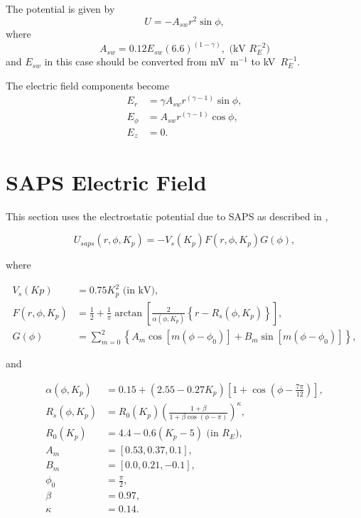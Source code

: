 \documentclass[]{article}
\begin{document}
The potential is given by 
\begin{equation}
	U = -A_{sw} r^2 \sin{\phi},
\end{equation}
where 
\begin{equation}
	A_{sw} = 0.12 E_{sw} (6.6)^{(1-\gamma)}, \text{ (kV $R_E^{-2}$)}
\end{equation}
and $E_{sw}$ in this case should be converted from mV~m$^{-1}$ to kV~$R_E^{-1}$.

The electric field components become
\begin{align}
E_r &= \gamma A_{sw} r^{(\gamma-1)}\sin{\phi},\\
E_\phi &= A_{sw} r^{(\gamma-1)} \cos{\phi},\\
E_z &= 0.
\end{align}


\section{SAPS Electric Field}

	This section uses the electrostatic potential due to SAPS as described in \citet{Goldstein2005},
	
	\begin{equation}
		U_{saps}(r,\phi,K_p) = -V_s(K_p) F(r,\phi,K_p) G(\phi),
	\end{equation}

	where
	
	\begin{align}
		V_s(Kp) &= 0.75 K_p^2 \text{ (in kV)}, \\
		F(r,\phi,K_p) &= \frac{1}{2} + \frac{1}{\pi}\arctan{\left[\frac{2}{\alpha(\phi,K_p)}\left\{ r - R_s(\phi,K_p)\right\}\right]}, \\
		G(\phi) &= \sum_{m=0}^{2} \left\{A_m \cos{[m(\phi - \phi_0)]} + B_m \sin{[m(\phi-\phi_0)]} \right\},
	\end{align}
	
	and
	
	\begin{align}
		\alpha(\phi,K_p) &= 0.15 + (2.55 - 0.27 K_p)\left[1 + \cos{\left(\phi - \frac{7\pi}{12}\right)}\right], \\
		R_s(\phi,K_p) &= R_0(K_p)\left(\frac{1+\beta}{1 + \beta\cos{(\phi-\pi)}}\right)^\kappa, \\
		R_0(K_p) &= 4.4 - 0.6(K_p - 5) \text{ (in $R_E$)},\\
		A_m &= [0.53,0.37,0.1],\\
		B_m &= [0.0,0.21,-0.1],\\
		\phi_0 &= \frac{\pi}{2}, \\
		\beta &= 0.97,\\
		\kappa &= 0.14.
	\end{align}
	
\end{document}
